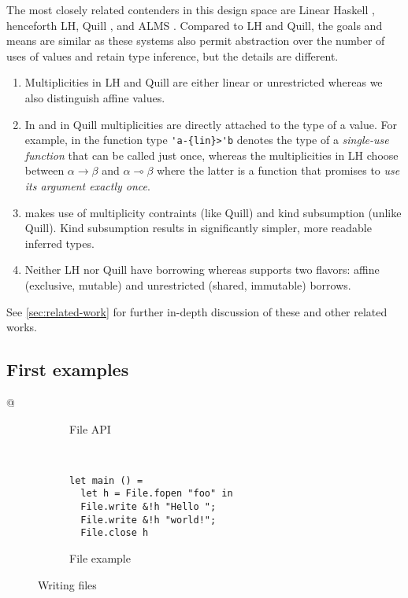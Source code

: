 The most closely related contenders in this design space are Linear Haskell
\cite{DBLP:journals/pacmpl/BernardyBNJS18}, henceforth LH,
Quill \cite{DBLP:conf/icfp/Morris16}, and ALMS \cite{DBLP:conf/popl/TovP11}.
Compared to LH and Quill, the goals and means are
similar as these systems also permit abstraction over the number of uses of
values and retain type inference, but the details are different.
\begin{enumerate}
\item Multiplicities in LH and Quill are either linear or unrestricted whereas
  we also distinguish affine values.
\item In \lang{} and in Quill multiplicities are directly attached to the type of a
  value. For example, in \lang{} the function type \lstinline/'a-{lin}>'b/
  denotes the type of a \emph{single-use function} that can be called
  just once, whereas the multiplicities in LH choose
  between $\alpha\to\beta$ and $\alpha \multimap\beta$ where the
  latter is a function that promises to \emph{use its argument exactly
    once}.
\item \lang{} makes use of multiplicity contraints (like Quill) and kind
  subsumption (unlike Quill). Kind subsumption results in significantly simpler, more readable
  inferred types.
\item Neither LH nor Quill have borrowing whereas \lang{} supports
  two flavors: affine (exclusive, mutable) and unrestricted (shared, immutable) borrows.
\end{enumerate}
See \cref{sec:related-work} for further in-depth discussion of these
and other related works.

\subsection{First examples}
\label{sec:first-example}


\lstMakeShortInline[keepspaces,basicstyle=\small\ttfamily]@

\begin{figure}[tp]
  \begin{subfigure}[t]{0.53\linewidth}
    
    \vspace{-15pt}
    \caption{File API}
    \label{fig:writing-files-api}
  \end{subfigure}~
  \begin{subfigure}[t]{0.43\linewidth}
\begin{lstlisting}
let main () =
  let h = File.fopen "foo" in
  File.write &!h "Hello ";
  File.write &!h "world!";
  File.close h
\end{lstlisting}
    \vspace{-10pt}
    \caption{File example}
    \label{fig:writing-files-example}
  \end{subfigure}
  \vspace{-10pt}
  \caption{Writing files}
  \label{fig:writing-files}
\end{figure}



